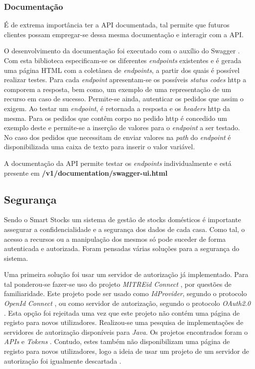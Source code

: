 \subsubsection{Documentação}

É de extrema importância ter a API documentada, tal permite que futuros clientes possam empregar-se dessa mesma documentação e interagir com a API.

O desenvolvimento da documentação foi executado com o auxílio do Swagger \cite{Swagger:api}. Com esta biblioteca especificam-se os diferentes \textit{endpoints} existentes e é gerada uma página HTML com a coletânea de \textit{endpoints}, a partir dos quais é possível realizar testes. Para cada \textit{endpoint} apresentam-se os possíveis \textit{status codes} \acrshort{http} a comporem a resposta, bem como, um exemplo de uma representação de um recurso em caso de sucesso. Permite-se ainda, autenticar os pedidos que assim o exigem. Ao testar um \textit{endpoint}, é retornada a resposta e os \textit{headers} \acrshort{http} da mesma. Para os pedidos que contêm corpo no pedido \acrshort{http} é concedido um exemplo deste e permite-se a inserção de valores para o \textit{endpoint} a ser testado. No caso dos pedidos que necessitam de enviar valores na \textit{path} do \textit{endpoint} é disponibilizada uma caixa de texto para inserir o valor variável. 

A documentação da API permite testar os \textit{endpoints} individualmente e está presente em \textbf{/v1/documentation/swagger-ui.html}


%
%
\subsection{Segurança}\label{subsec334}

Sendo o Smart Stocks um sistema de gestão de stocks domésticos é importante assegurar a confidencialidade e a segurança dos dados de cada casa. Como tal, o acesso a recursos ou a manipulação dos mesmos só pode suceder de forma autenticada e autorizada. Foram pensadas várias soluções para a segurança do sistema.

Uma primeira solução foi usar um servidor de autorização já implementado. Para tal ponderou-se fazer-se uso do projeto \textit{MITREid Connect} \cite{mitreidconnect:impl}, por questões de familiaridade. Este projeto pode ser usado como \textit{IdProvider}, segundo o protocolo \textit{OpenId Connect} \cite{OpenIDConnect:introduction}, ou como servidor de autorização, segundo o protocolo \textit{OAuth2.0} \cite{OAuth20:introduction}. Esta opção foi rejeitada uma vez que este projeto não contém uma página de registo para novos utilizadores. Realizou-se uma pesquisa de implementações de servidores de autorização disponíveis para \textit{Java}. Os projetos encontrados foram o \textit{APIs} \cite{OAuthApis:impl} e \textit{Tokens} \cite{tokens:impl}. Contudo, estes também não disponibilizam uma página de registo para novos utilizadores, logo a ideia de usar um projeto de um servidor de autorização foi igualmente descartada . 


